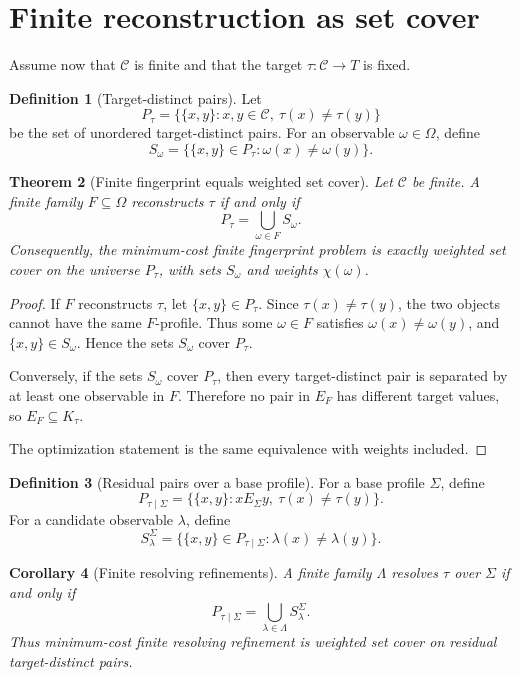 \documentclass[11pt]{article}
\newtheorem{theorem}{Theorem}[section]
\newtheorem{corollary}[theorem]{Corollary}
\theoremstyle{definition}
\newtheorem{definition}[theorem]{Definition}
\theoremstyle{remark}
\begin{document}
\section{Finite reconstruction as set cover}

Assume now that \(\mathcal C\) is finite and that the target \(\tau:\mathcal C\to T\) is fixed.

\begin{definition}[Target-distinct pairs]
Let
\[
P_\tau=\{\{x,y\}:x,y\in\mathcal C,\ \tau(x)\neq\tau(y)\}
\]
be the set of unordered target-distinct pairs.  For an observable \(\omega\in\Omega\), define
\[
S_\omega=\{\{x,y\}\in P_\tau:\omega(x)\neq\omega(y)\}.
\]
\end{definition}

\begin{theorem}[Finite fingerprint equals weighted set cover]
Let \(\mathcal C\) be finite.  A finite family \(F\subseteq\Omega\) reconstructs \(\tau\) if and only if
\[
P_\tau=\bigcup_{\omega\in F}S_\omega.
\]
Consequently, the minimum-cost finite fingerprint problem is exactly weighted set cover on the universe \(P_\tau\), with sets \(S_\omega\) and weights \(\chi(\omega)\).
\end{theorem}

\begin{proof}
If \(F\) reconstructs \(\tau\), let \(\{x,y\}\in P_\tau\).  Since \(\tau(x)\neq\tau(y)\), the two objects cannot have the same \(F\)-profile.  Thus some \(\omega\in F\) satisfies \(\omega(x)\neq\omega(y)\), and \(\{x,y\}\in S_\omega\).  Hence the sets \(S_\omega\) cover \(P_\tau\).

Conversely, if the sets \(S_\omega\) cover \(P_\tau\), then every target-distinct pair is separated by at least one observable in \(F\).  Therefore no pair in \(E_F\) has different target values, so \(E_F\subseteq K_\tau\).

The optimization statement is the same equivalence with weights included.
\end{proof}

\begin{definition}[Residual pairs over a base profile]
For a base profile \(\Sigma\), define
\[
P_{\tau\mid\Sigma}
=
\{\{x,y\}:xE_\Sigma y,\ \tau(x)\neq\tau(y)\}.
\]
For a candidate observable \(\lambda\), define
\[
S_\lambda^{\Sigma}
=
\{\{x,y\}\in P_{\tau\mid\Sigma}:\lambda(x)\neq\lambda(y)\}.
\]
\end{definition}

\begin{corollary}[Finite resolving refinements]
A finite family \(\Lambda\) resolves \(\tau\) over \(\Sigma\) if and only if
\[
P_{\tau\mid\Sigma}
=
\bigcup_{\lambda\in\Lambda}S_\lambda^{\Sigma}.
\]
Thus minimum-cost finite resolving refinement is weighted set cover on residual target-distinct pairs.
\end{corollary}
\end{document}
